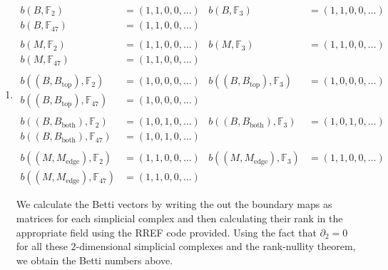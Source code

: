 \documentclass[12 pt, letterpaper]{hmcpset}
\begin{document}
\begin{solution}
\begin{enumerate}
		\item
			\[
				\boxed{
					\begin{aligned}
						b(B, \mathbb{F}_{2}) & = (1, 1, 0, 0, \dots) & b(B, \mathbb{F}_{3}) & = (1, 1, 0, 0, \dots) \\ b(B, \mathbb{F}_{47}) & = (1, 1, 0, 0, \dots) \\ \\
						b(M, \mathbb{F}_{2}) & = (1, 1, 0, 0, \dots) & b(M, \mathbb{F}_{3}) & = (1, 1, 0, 0, \dots) \\ b(M, \mathbb{F}_{47}) & = (1, 1, 0, 0, \dots) \\ \\
						b((B, B_{\text{top}}), \mathbb{F}_{2}) & = (1, 0, 0, 0, \dots) & b((B, B_{\text{top}}), \mathbb{F}_{3}) & = (1, 0, 0, 0, \dots) \\ b((B, B_{\text{top}}), \mathbb{F}_{47}) & = (1, 0, 0, 0, \dots) \\ \\
						b((B, B_{\text{both}}), \mathbb{F}_{2}) & = (1, 0, 1, 0, \dots) & b((B, B_{\text{both}}), \mathbb{F}_{3}) & = (1, 0, 1, 0, \dots) \\ b((B, B_{\text{both}}), \mathbb{F}_{47}) & = (1, 0, 1, 0, \dots) \\ \\
						b((M, M_{\text{edge}}), \mathbb{F}_{2}) & = (1, 1, 0, 0, \dots) & b((M, M_{\text{edge}}), \mathbb{F}_{3}) & = (1, 1, 0, 0, \dots) \\ b((M, M_{\text{edge}}), \mathbb{F}_{47}) & = (1, 1, 0, 0, \dots)
					\end{aligned}
				}
			\]

			We calculate the Betti vectors by writing the out the boundary maps as matrices for each simplicial complex and then calculating their rank in the appropriate field using the RREF code provided. Using the fact that $\partial_{2} = 0$ for all these $2$-dimensional simplicial complexes and the rank-nullity theorem, we obtain the Betti numbers above.
	\end{enumerate}
\end{solution}
\end{document}
